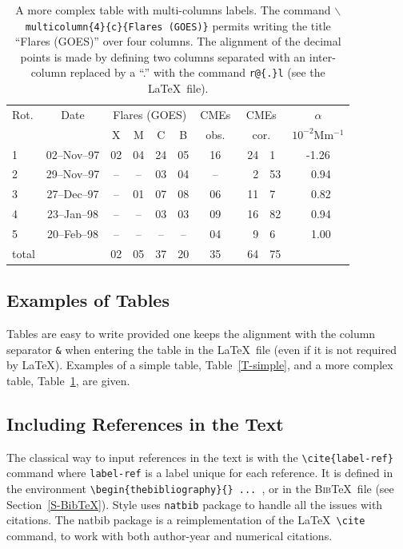 \documentclass[namedreferences]{solarphysics}
\newcommand{\BibTeX}{\textsc{Bib}\TeX}
\begin{document}
\begin{article}
  \begin{table}
\caption{ A more complex table with multi-columns labels. The command 
\texttt{$\backslash$multicolumn\{4\}\{c\}\{Flares (GOES)\}} permits
writing the title ``Flares (GOES)'' over four columns. The alignment
of the decimal points is made by defining two columns separated with an
inter-column replaced by a ``.'' with the command \texttt{r@\{.\}l}  
(see the \LaTeX\ file).
}
\label{T-complex}
\begin{tabular}{lcccccc r@{.}l c} %
  \hline
Rot. & Date & \multicolumn{4}{c}{Flares (GOES)}& CMEs 
     & \multicolumn{2}{c}{CMEs} & $\alpha$ \\
     &      &   X & M & C & B                  & obs. 
     & \multicolumn{2}{c}{cor.} & $10^{-2}$Mm$^{-1}$\\
  \hline
1 & 02--Nov--97 & 02 & 04 & 24 & 05 & 16  & ~24&1 & -1.26 \\
2 & 29--Nov--97 & -- & -- & 03 & 04 & --  &   2&53& ~0.94 \\
3 & 27--Dec--97 & -- & 01 & 07 & 08 & 06  &  11&7 & ~0.82 \\
4 & 23--Jan--98 & -- & -- & 03 & 03 & 09  &  16&82& ~0.94 \\
5 & 20--Feb--98 & -- & -- & -- & -- & 04  &   9&6 & ~1.00 \\
total&          & 02 & 05 & 37 & 20 & 35  &  64&75&       \\
  \hline
\end{tabular}
\end{table}

\subsection{Examples of Tables} %
  \label{S-tables}
   Tables are easy to write provided one keeps the alignment 
with the column separator \texttt{\&} when entering the table 
in the \LaTeX\ file 
(even if it is not required by \LaTeX). Examples of a simple table,
Table~\ref{T-simple}, and a more complex table, Table~\ref{T-complex},
are given.

\subsection{Including References in the Text} %
  \label{S-references}
  The classical way to input references in the text is with the 
\verb+\cite{label-ref}+ command where \verb+label-ref+ is a label
unique for each reference.  It is defined in the environment
\verb+\begin{thebibliography}{} ... +, or in the \BibTeX\ file
(see Section~\ref{S-BibTeX}). 
Style uses \texttt{natbib} package to handle all the issues with citations.
The natbib package is a reimplementation of the \LaTeX\ \verb+\cite+ command, 
to work with both author-year and numerical citations.


\end{article}
\end{document}
